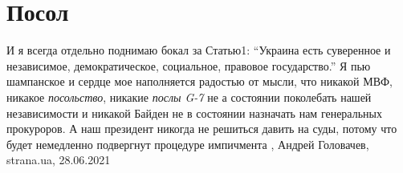  
 
 
 
 
\chapter{Посол}
\label{sec:slova.posol}

И я всегда отдельно поднимаю бокал за Статью1: \enquote{Украина есть суверенное
и независимое, демократическое, социальное, правовое государство.} Я пью
шампанское и сердце мое наполняется радостью от мысли, что никакой МВФ, никакое
\emph{посольство}, никакие \emph{послы G-7} не а состоянии поколебать нашей независимости и
никакой Байден не в состоянии назначать нам генеральных прокуроров. А наш
президент никогда не решиться давить на суды, потому что будет немедленно
подвергнут процедуре импичмента
, 
Андрей Головачев, strana.ua, 28.06.2021
